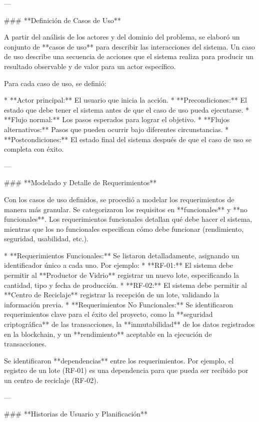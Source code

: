 ---

### **Definición de Casos de Uso**

A partir del análisis de los actores y del dominio del problema, se elaboró un conjunto de **casos de uso** para describir las interacciones del sistema. Un caso de uso describe una secuencia de acciones que el sistema realiza para producir un resultado observable y de valor para un actor específico.

Para cada caso de uso, se definió:

* **Actor principal:** El usuario que inicia la acción.
* **Precondiciones:** El estado que debe tener el sistema antes de que el caso de uso pueda ejecutarse.
* **Flujo normal:** Los pasos esperados para lograr el objetivo.
* **Flujos alternativos:** Pasos que pueden ocurrir bajo diferentes circunstancias.
* **Postcondiciones:** El estado final del sistema después de que el caso de uso se completa con éxito.

---

### **Modelado y Detalle de Requerimientos**

Con los casos de uso definidos, se procedió a modelar los requerimientos de manera más granular. Se categorizaron los requisitos en **funcionales** y **no funcionales**. Los requerimientos funcionales detallan qué debe hacer el sistema, mientras que los no funcionales especifican cómo debe funcionar (rendimiento, seguridad, usabilidad, etc.).

* **Requerimientos Funcionales:** Se listaron detalladamente, asignando un identificador único a cada uno. Por ejemplo:
    * **RF-01:** El sistema debe permitir al **Productor de Vidrio** registrar un nuevo lote, especificando la cantidad, tipo y fecha de producción.
    * **RF-02:** El sistema debe permitir al **Centro de Reciclaje** registrar la recepción de un lote, validando la información previa.
* **Requerimientos No Funcionales:** Se identificaron requerimientos clave para el éxito del proyecto, como la **seguridad criptográfica** de las transacciones, la **inmutabilidad** de los datos registrados en la blockchain, y un **rendimiento** aceptable en la ejecución de transacciones.

Se identificaron **dependencias** entre los requerimientos. Por ejemplo, el registro de un lote (RF-01) es una dependencia para que pueda ser recibido por un centro de reciclaje (RF-02).

---

### **Historias de Usuario y Planificación**

